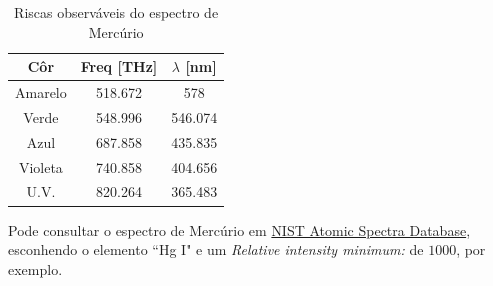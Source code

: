 \documentclass[a4paper,12pt]{article}  %
\begin{document}
\begin{table}[!hbp]
\begin{center}
	\begin{tabular}{|c|c|c|}
	\hline
	Côr  & Freq [THz] & $\lambda$ [nm]  \\
	\hline
	Amarelo & 518.672 & 578 \\
	Verde & 548.996 & 546.074\\
	Azul & 687.858  & 435.835 \\
	Violeta & 740.858  & 404.656\\
	U.V.    & 820.264  & 365.483 \\
	\hline
 	\end{tabular}
	\caption{Riscas observáveis do espectro de Mercúrio} 
	\label{tab:Hg}
	\end{center}
\end{table}

Pode consultar o espectro de Mercúrio em  \href{http://physics.nist.gov/asd}{
NIST Atomic Spectra Database}, esconhendo o elemento ``Hg I" e um \emph{Relative intensity minimum:} de $1000$, por exemplo. 	  	



\end{document}
